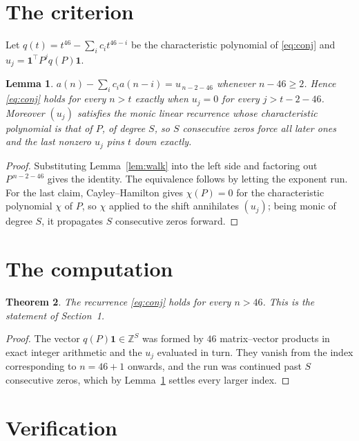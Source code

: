 \documentclass[11pt,a4paper]{article}
\theoremstyle{plain}
\newtheorem{theorem}{Theorem}
\newtheorem{lemma}[theorem]{Lemma}
\theoremstyle{definition}
\begin{document}
\section{The criterion}

Let $q(t)=t^{46}-\sum_i c_i t^{46-i}$ be the characteristic polynomial of
\eqref{eq:conj} and $u_j=\mathbf{1}^{\!\top}P^{j}q(P)\mathbf{1}$.

\begin{lemma}\label{lem:crit}
$a(n)-\sum_i c_i a(n-i)=u_{\,n-2-46}$ whenever $n-46\ge2$. Hence
\eqref{eq:conj} holds for every $n>t$ exactly when $u_j=0$ for every
$j>t-2-46$. Moreover $(u_j)$ satisfies the monic linear recurrence whose
characteristic polynomial is that of $P$, of degree $S$, so $S$ consecutive zeros force all
later ones and the last nonzero $u_j$ pins $t$ down exactly.
\end{lemma}

\begin{proof}
Substituting Lemma~\ref{lem:walk} into the left side and factoring out
$P^{\,n-2-46}$ gives the identity. The equivalence follows by letting the exponent
run. For the last claim, Cayley--Hamilton gives $\chi(P)=0$ for the characteristic
polynomial $\chi$ of $P$, so $\chi$ applied to the shift annihilates $(u_j)$; being monic of
degree $S$, it propagates $S$ consecutive zeros forward.
\end{proof}

\section{The computation}

\begin{theorem}
The recurrence \eqref{eq:conj} holds for every $n>46$. This is the statement of
Section~1.
\end{theorem}

\begin{proof}
The vector $q(P)\mathbf{1}\in\mathbb{Z}^{S}$ was formed by $46$ matrix--vector
products in exact integer arithmetic and the $u_j$ evaluated in turn. They vanish from the
index corresponding to $n=46+1$ onwards, and the run was continued past $S$ consecutive
zeros, which by Lemma~\ref{lem:crit} settles every larger index.
\end{proof}

\section{Verification}
\end{document}
